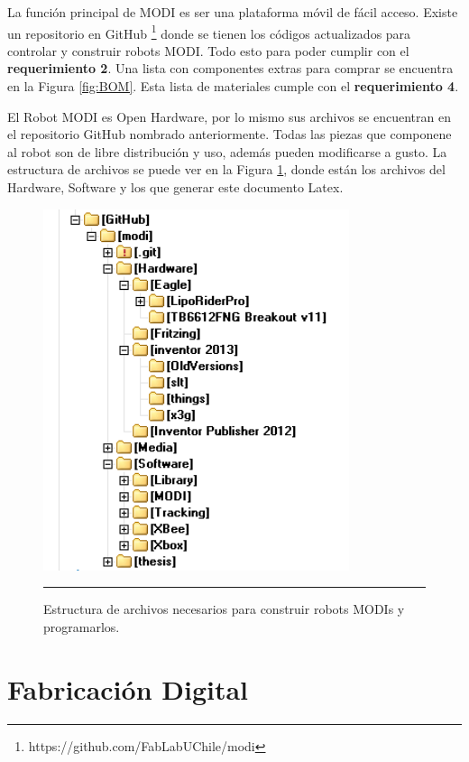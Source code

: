 La función principal de MODI es ser una plataforma móvil de fácil acceso. Existe un repositorio en GitHub  \footnote{https://github.com/FabLabUChile/modi} donde se tienen los códigos actualizados para controlar y construir robots MODI. Todo esto para poder cumplir con el \textbf{requerimiento 2}. Una lista con componentes extras para comprar se encuentra en la Figura \ref{fig:BOM}. Esta lista de materiales cumple con el \textbf{requerimiento 4}. 

El Robot MODI es Open Hardware, por lo mismo sus archivos se encuentran en el repositorio GitHub nombrado anteriormente. Todas las piezas que componene al robot son de libre distribución y uso, además pueden modificarse a gusto. La estructura de archivos se puede ver en la Figura \ref{fig:tree}, donde están los archivos del Hardware, Software y los que generar este documento Latex.
\begin{figure}[htbp]
	\centering
		\includegraphics[width=0.8\textwidth]{./Figures/MODI/tree.png}
		\rule{35em}{0.5pt}
	\caption[Estructura de archivos]{Estructura de archivos necesarios para construir robots MODIs y programarlos.}
	\label{fig:tree}
\end{figure}




\section{Fabricación Digital}

